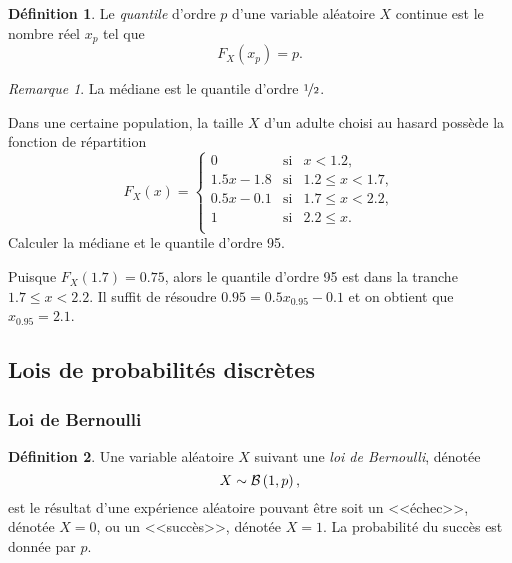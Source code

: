 \documentclass[11pt]{article}
\makeatletter
\newcommand\Bin[2]{%
	\ensuremath{%
		\mathcal{B}\left(#1,#2\right)%
	}%
}%
\theoremstyle{remark}
\newtheorem*{remark}{Remarque}
\theoremstyle{definition}
\newtheorem*{@definition}{Définition}
\newenvironment{definition}{%
	\begin{@definition}%
}{%
	\end{@definition}%
	\setcounter{property}{0}%
}
\makeatother
\begin{document}
\begin{definition}
	Le \textit{quantile} d'ordre $p$ d'une variable aléatoire $X$ continue est
	le nombre réel $x_p$ tel que
	\begin{equation*}
		F_X(x_p)=p.
	\end{equation*}
\end{definition}

\begin{remark}
	La médiane est le quantile d'ordre $\nicefrac{1}{2}$.
\end{remark}

\begin{exemple}
	Dans une certaine population, la taille $X$ d'un adulte choisi au hasard
	possède la fonction de répartition 
	\begin{equation*}
		F_X(x)=\left\{
			\begin{matrix}
				0        & \text{si} & x<1.2,\\
				1.5x-1.8 & \text{si} & 1.2\leq x<1.7,\\
				0.5x-0.1 & \text{si} & 1.7\leq x<2.2,\\
				1        & \text{si} & 2.2\leq x.\\
			\end{matrix}
		\right.
	\end{equation*}
	Calculer la médiane et le quantile d'ordre 95.

	Puisque $F_X(1.7)=0.75$, alors le quantile d'ordre 95 est dans la tranche
	$1.7\leq x<2.2$. Il suffit de résoudre $0.95=0.5x_{0.95}-0.1$ et on obtient
	que $x_{0.95}=2.1$.
\end{exemple}

\subsection{Lois de probabilités discrètes}
\subsubsection{Loi de Bernoulli}
\begin{definition}
	Une variable aléatoire $X$ suivant une \textit{loi de Bernoulli}, dénotée
	\begin{equation*}
		X\sim\Bin{1}{p},
	\end{equation*}
	est le résultat d'une expérience aléatoire pouvant être soit un <<échec>>,
	dénotée $X=0$, ou un <<succès>>, dénotée $X=1$. La probabilité du succès
	est donnée par $p$.
\end{definition}
\end{document}
